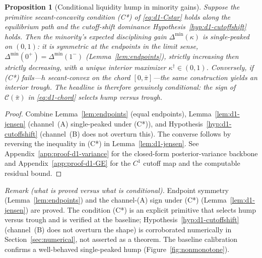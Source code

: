 \documentclass[11pt]{article}
\newtheorem{proposition}{Proposition}
\newcommand{\1}{\mathbf{1}}
\begin{document}
\begin{proposition}[Conditional liquidity hump in minority gains]
\label{prop:nonmonotone}
Suppose the primitive secant-concavity condition \textup{(C*)} of
\eqref{eq:d1-Cstar} holds along the equilibrium path and the cutoff-shift
dominance Hypothesis~\ref{hyp:d1-cutoffshift} holds. Then the minority's
expected disciplining gain $\Delta^{\min}(\kappa)$ is single-peaked on $(0,1)$:
it is symmetric at the endpoints in the limit sense,
$\Delta^{\min}(0^+)=\Delta^{\min}(1^-)$
(Lemma~\ref{lem:endpoints}), strictly increasing then strictly decreasing, with
a unique interior maximizer $\kappa^{\dagger}\in(0,1)$. Conversely, if
\textup{(C*)} fails---$h$ secant-convex on the chord $[0,\bar\pi]$---the same
construction yields an interior \emph{trough}. The headline is therefore
genuinely conditional: the sign of $\mathcal{C}(\bar\pi)$ in \eqref{eq:d1-chord}
selects hump versus trough.
\end{proposition}

\begin{proof}
Combine Lemma~\ref{lem:endpoints} (equal endpoints), Lemma~\ref{lem:d1-jensen}
(channel~(A) single-peaked under \textup{(C*)}), and
Hypothesis~\ref{hyp:d1-cutoffshift} (channel~(B) does not overturn this). The
converse follows by reversing the inequality in \textup{(C*)} in
Lemma~\ref{lem:d1-jensen}. See Appendix~\ref{app:proof-d1-variance} for the
closed-form posterior-variance backbone and Appendix~\ref{app:proof-d1-GE} for
the $C^1$ cutoff map and the computable residual bound.
\end{proof}

\emph{Remark (what is proved versus what is conditional).} Endpoint symmetry
(Lemma~\ref{lem:endpoints}) and the channel-(A) sign under \textup{(C*)}
(Lemma~\ref{lem:d1-jensen}) are proved. The condition \textup{(C*)} is an
explicit primitive that selects hump versus trough and is verified at the
baseline; Hypothesis~\ref{hyp:d1-cutoffshift} (channel~(B) does not overturn the
shape) is corroborated numerically in Section~\ref{sec:numerical}, not asserted
as a theorem. The baseline calibration confirms a well-behaved single-peaked
hump (Figure~\ref{fig:nonmonotone}).
\end{document}
